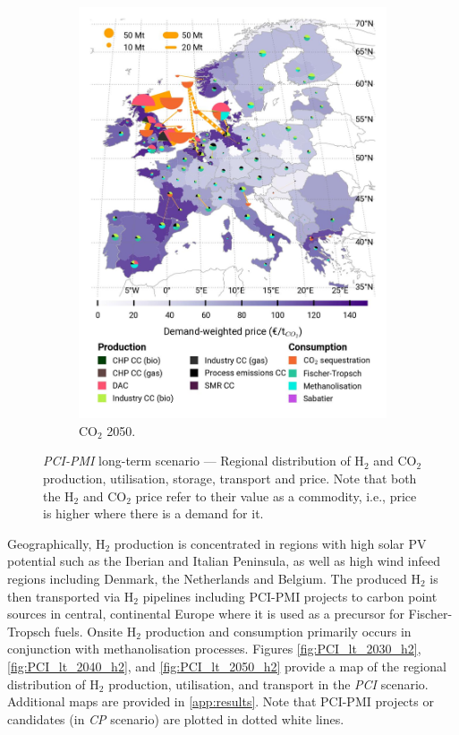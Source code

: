 \documentclass[pdflatex,sn-nature]{sn-jnl}%
\theoremstyle{thmstyleone}%
\theoremstyle{thmstyletwo}%
\theoremstyle{thmstylethree}%
\begin{document}
\begin{figure}[htbp]
\begin{subfigure}[t]{0.32\textwidth}
      \includegraphics[width=1\textwidth]{figures/maps/pcipmi/base_s_adm___2050-balance_map_co2_stored.jpg} 
      \caption{CO$_2$ 2050.}
      \label{fig:PCI_lt_2050_co2}
  \end{subfigure}
  \vspace{0.3cm}
  \caption{\textit{PCI-PMI} long-term scenario --- Regional distribution of H$_2$ and CO$_2$ production, utilisation, storage, transport and price. Note that both the H$_2$ and CO$_2$ price refer to their value as a commodity, i.e., price is higher where there is a demand for it.}
  \label{fig:PCI_lt}
\end{figure}

Geographically, H$_2$ production is concentrated in regions with high solar PV potential such as the Iberian and Italian Peninsula, as well as high wind infeed regions including Denmark, the Netherlands and Belgium. The produced H$_2$ is then transported via H$_2$ pipelines including PCI-PMI projects to carbon point sources  in central, continental Europe where it is used as a precursor for Fischer-Tropsch fuels. Onsite H$_2$ production and consumption primarily occurs in conjunction with methanolisation processes. Figures \ref{fig:PCI_lt_2030_h2}, \ref{fig:PCI_lt_2040_h2}, and \ref{fig:PCI_lt_2050_h2} provide a map of the regional distribution of H$_2$ production, utilisation, and transport in the \textit{PCI} scenario. Additional maps are provided in \ref{app:results}. Note that PCI-PMI projects or candidates (in \textit{CP} scenario) are plotted in dotted white lines.
\end{document}
